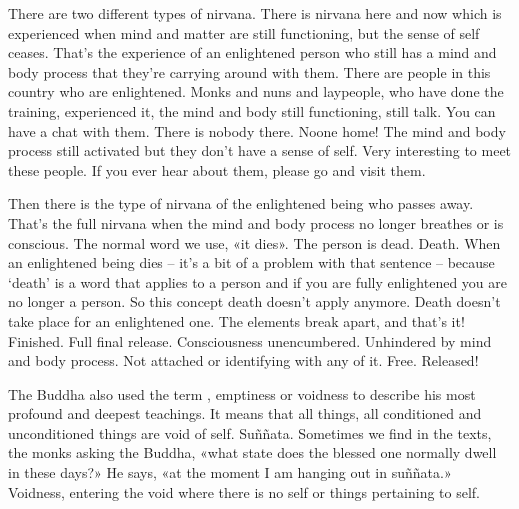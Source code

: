 \documentclass[letterpaper,10pt,english]{sphinxmanual}
\begin{document}
\sphinxAtStartPar
There are two different types of nirvana. There is nirvana here and now
which  is  experienced  when  mind  and  matter  are  still  functioning,  but  the
sense of self ceases. That’s the experience of an enlightened person who still
has a mind and body process that they’re carrying around with them. There
are  people  in  this  country  who  are  enlightened.  Monks  and  nuns  and  laypeople, who have done the training, experienced it, the mind and body still
functioning, still talk. You can have a chat with them. There is nobody there.
No\sphinxhyphen{}one home! The mind and body process still activated but they don’t have
a sense of self. Very interesting to meet these people. If you ever hear about
them, please go and visit them.

\sphinxAtStartPar
Then there is the type of nirvana of the enlightened being who passes
away.  That’s  the  full  nirvana  when  the  mind  and  body  process  no  longer
breathes or is conscious. The normal word we use, «it dies». The person is
dead. Death. When an enlightened being dies – it’s a bit of a problem with
that  sentence  –  because  ‘death’  is  a  word  that  applies  to  a  person  and  if
you are fully enlightened you are no longer a person. So this concept death
doesn’t apply anymore. Death doesn’t take place for an enlightened one. The
elements break apart, and that’s it! Finished.
Full final release. Consciousness unencumbered. Unhindered by mind and
body process. Not attached or identifying with any of it. Free. Released!

\sphinxAtStartPar
The  Buddha  also  used  the  term
,  emptiness  or  voidness  to
describe his most profound and deepest teachings. It means that all things,
all conditioned and unconditioned things are void of self. Suññata. Sometimes we find in the texts, the monks asking the Buddha, «what state does
the blessed one normally dwell in these days?» He says, «at the moment I am
hanging out in suññata.» Voidness, entering the void where there is no self
or things pertaining to self.
\end{document}
